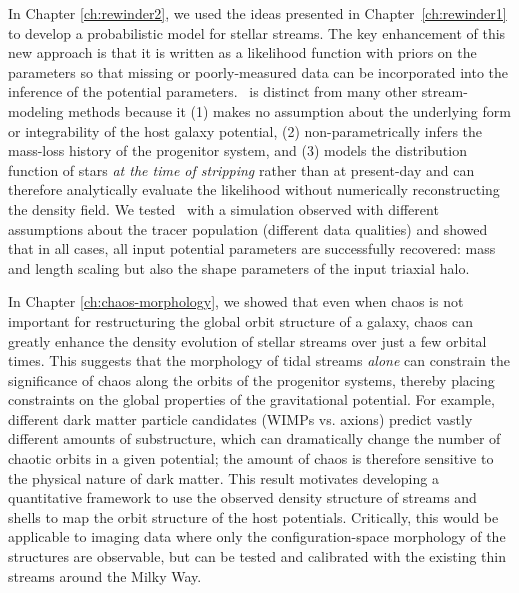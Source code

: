 In Chapter \ref{ch:rewinder2}, we used the ideas presented in Chapter~\ref{ch:rewinder1} to develop a probabilistic model for stellar streams. The key enhancement of this new approach is that it is written as a likelihood function with priors on the parameters so that missing or poorly-measured data can be incorporated into the inference of the potential parameters. \rewinder\ is distinct from many other stream-modeling methods because it (1) makes no assumption about the underlying form or integrability of the host galaxy potential, (2) non-parametrically infers the mass-loss history of the progenitor system, and (3) models the distribution function of stars \emph{at the time of stripping} rather than at present-day and can therefore analytically evaluate the likelihood without numerically reconstructing the density field. We tested \rewinder\ with a simulation observed with different assumptions about the tracer population (different data qualities) and showed that in all cases, all input potential parameters are successfully recovered: mass and length scaling but also the shape parameters of the input triaxial halo. 

In Chapter \ref{ch:chaos-morphology}, we showed that even when chaos is not important for restructuring the global orbit structure of a galaxy, chaos can greatly enhance the density evolution of stellar streams over just a few orbital times. This suggests that the morphology of tidal streams \emph{alone} can constrain the significance of chaos along the orbits of the progenitor systems, thereby placing constraints on the global properties of the gravitational potential. For example, different dark matter particle candidates (WIMPs vs. axions) predict vastly different amounts of substructure, which can dramatically change the number of chaotic orbits in a given potential; the amount of chaos is therefore sensitive to the physical nature of dark matter. This result motivates developing a quantitative framework to use the observed density structure of streams and shells to map the orbit structure of the host potentials. Critically, this would be applicable to imaging data where only the configuration-space morphology of the structures are observable, but can be tested and calibrated with the existing thin streams around the Milky Way.

